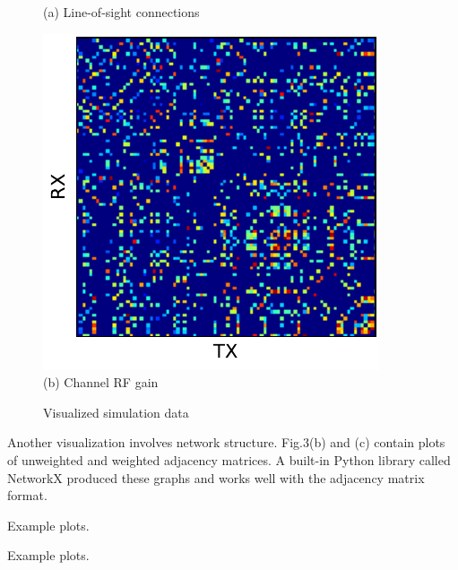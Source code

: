 \documentclass[conference]{IEEEtran}
\begin{document}
\begin{figure}[t]
\begin{minipage}[b]{0.49\linewidth}
\begin{center}
      {\footnotesize(a) Line-of-sight connections}
    \end{center}
  \end{minipage}
  \begin{minipage}[b]{0.49\linewidth}
    \begin{center}
      \includegraphics[width=\textwidth]{images/weighted_plot.pdf} \\
      {\footnotesize(b) Channel RF gain}
    \end{center}
  \end{minipage}
  \caption{Visualized simulation data}
  \label{fig:postprocess}
\end{figure}

Another visualization involves network structure.  Fig.3(b) and (c) contain
plots of unweighted and weighted adjacency matrices.  A built-in Python library
called NetworkX produced these graphs and works well with the adjacency matrix
format.




\vspace{80pt}

Example plots.

\vspace{80pt}

Example plots.

\vspace{80pt}
\end{document}
